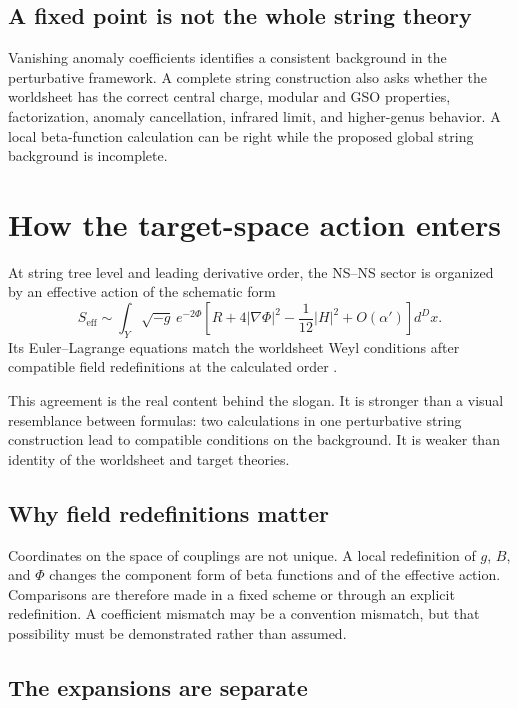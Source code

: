 \documentclass[11pt]{article}
\begin{document}
\subsection{A fixed point is not the whole string theory}

Vanishing anomaly coefficients identifies a consistent background in the
perturbative framework.  A complete string construction also asks whether
the worldsheet has the correct central charge, modular and GSO properties,
factorization, anomaly cancellation, infrared limit, and higher-genus
behavior.  A local beta-function calculation can be right while the proposed
global string background is incomplete.

\section{How the target-space action enters}

At string tree level and leading derivative order, the NS--NS sector is
organized by an effective action of the schematic form
\[
S_{\mathrm{eff}}
\sim\int_Y\sqrt{-g}\,e^{-2\Phi}
\left[
R+4|\nabla\Phi|^2-\frac1{12}|H|^2+O(\alpha')
\right]d^Dx .
\]
Its Euler--Lagrange equations match the worldsheet Weyl conditions after
compatible field redefinitions at the calculated order
\cite{CallanEtAl1985,MetsaevTseytlin1987,HullTownsend1988}.

This agreement is the real content behind the slogan.  It is stronger than a
visual resemblance between formulas: two calculations in one perturbative
string construction lead to compatible conditions on the background.  It is
weaker than identity of the worldsheet and target theories.

\subsection{Why field redefinitions matter}

Coordinates on the space of couplings are not unique.  A local
redefinition of \(g\), \(B\), and \(\Phi\) changes the component form of beta
functions and of the effective action.  Comparisons are therefore made in a
fixed scheme or through an explicit redefinition.  A coefficient mismatch
may be a convention mismatch, but that possibility must be demonstrated
rather than assumed.

\subsection{The expansions are separate}
\end{document}
